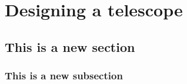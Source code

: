 \chapter{Designing a telescope}

\section{This is a new section}
\subsection{This is a new subsection}
